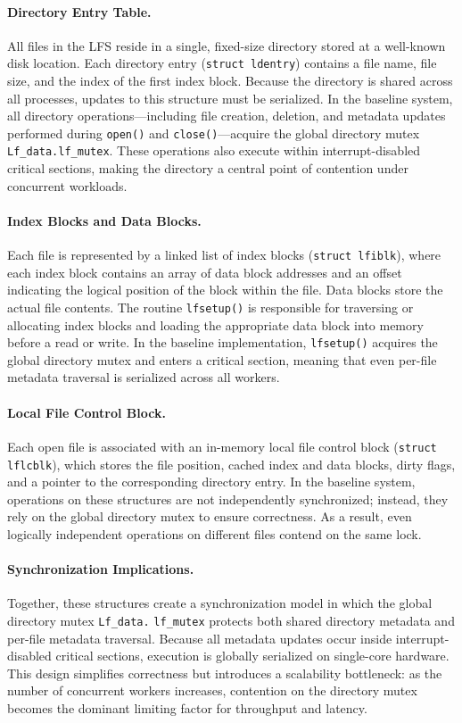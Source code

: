 \documentclass[sigconf]{acmart}
\begin{document}
\paragraph{Directory Entry Table.}
All files in the LFS reside in a single, fixed-size directory stored at a well-known disk location. Each directory entry (\texttt{struct ldentry}) contains a file name, file size, and the index of the first index block. Because the directory is shared across all processes, updates to this structure must be serialized. In the baseline system, all directory
operations---including file creation, deletion, and metadata updates performed during \texttt{open()} and \texttt{close()}---acquire the global directory mutex \texttt{Lf\_data.lf\_mutex}. These operations also execute
within interrupt-disabled critical sections, making the directory a central point of contention under concurrent workloads.

\paragraph{Index Blocks and Data Blocks.}
Each file is represented by a linked list of index blocks
(\texttt{struct lfiblk}), where each index block contains an array of data block addresses and an offset indicating the logical position of the block within the file. Data blocks store the actual file contents. The routine \texttt{lfsetup()} is responsible for traversing or allocating
index blocks and loading the appropriate data block into memory before a read or write. In the baseline implementation, \texttt{lfsetup()} acquires the global directory mutex and enters a critical section, meaning that even per-file metadata traversal is serialized across all workers.

\paragraph{Local File Control Block.}
Each open file is associated with an in-memory local file control block (\texttt{struct lflcblk}), which stores the file position, cached index and data blocks, dirty flags, and a pointer to the corresponding directory entry. In the baseline system, operations on these structures are not
independently synchronized; instead, they rely on the global directory mutex to ensure correctness. As a result, even logically independent operations on different files contend on the same lock.

\paragraph{Synchronization Implications.}
Together, these structures create a synchronization model in which the global directory mutex \texttt{Lf\_data.} \texttt{lf\_mutex} protects both shared directory metadata and per-file metadata traversal. Because all metadata updates occur inside interrupt-disabled critical sections, execution is globally serialized on single-core hardware. This design
simplifies correctness but introduces a scalability bottleneck: as the number of concurrent workers increases, contention on the directory mutex becomes the dominant limiting factor for throughput and latency.
\end{document}
